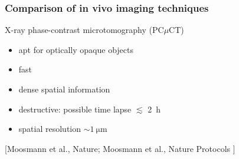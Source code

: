 \documentclass{beamer}
\newcommand{\reff}[1]{\begin{flushright}\scriptsize [#1]\end{flushright}}
\begin{document}
\begin{frame}
  \frametitle{Comparison of in vivo imaging techniques}
  X-ray phase-contrast microtomography (PC$\mu$CT)
  \begin{itemize}
  \item apt for optically opaque objects
  \item fast
  \item dense spatial information
  \item destructive: possible time lapse $\lesssim$ \SI{2}{h}
  \item spatial resolution $\sim\SI{1}{\micro\metre}$
  \end{itemize}    
  \reff{Moosmann et al., Nature;
    Moosmann et al., Nature Protocols
  }
\end{frame}
\end{document}
